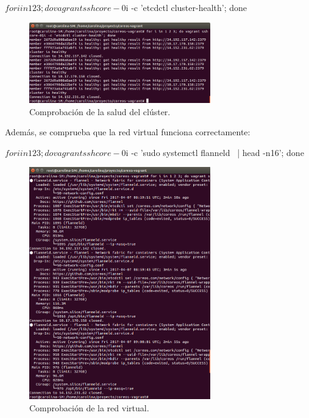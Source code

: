 \begin{code}
$ for i in 1 2 3; do vagrant ssh core-0$i -c 'etcdctl cluster-health'; done
\end{code}

\begin{figure}[H]
\centering
\includegraphics[width=0.7\textwidth]{images/figures/cluster-health-aws-3.png}
\caption{Comprobación de la salud del clúster.}
\end{figure}

Además, se comprueba que la red virtual funciona correctamente:

\begin{code}
$ for i in 1 2 3; do vagrant ssh core-0$i -c 'sudo systemctl flanneld \
  | head -n16'; done
\end{code}

\begin{figure}[H]
\centering
\includegraphics[width=0.7\textwidth]{images/figures/flanneld-aws-3.png}
\caption{Comprobación de la red virtual.}
\end{figure}

